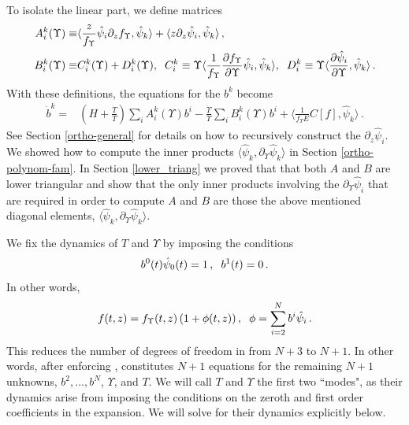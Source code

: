 To isolate the linear part, we define matrices
\begin{align}\label{A_B_matrices}
A^k_i(\Upsilon)\equiv&\langle\frac{z}{f_\Upsilon }\hat\psi_i\partial_zf_\Upsilon ,\hat\psi_k\rangle+\langle z\partial_z \hat\psi_i,\hat\psi_k\rangle\,,\\
B^k_i(\Upsilon)\equiv& C_i^k(\Upsilon)+D_i^k(\Upsilon),\hspace{2mm} C_i^k\equiv\Upsilon\langle\frac{1}{f_\Upsilon }\frac{\partial f_\Upsilon }{\partial\Upsilon}\hat\psi_i,\hat\psi_k\rangle,\hspace{2mm} D_i^k\equiv\Upsilon\langle\frac{\partial\hat{\psi}_i}{\partial \Upsilon},\hat\psi_k\rangle\,. \notag
\end{align}
 With these definitions, the equations for the $b^k$ become
\begin{align}\label{b_eq}
\dot b^k=& \left(H+\frac{\dot{T}}{T}\right)\sum_i A_i^k(\Upsilon)b^i-\frac{\dot{\Upsilon}}{\Upsilon}\sum_i B_i^k(\Upsilon)b^i+\langle\frac{1}{f_\Upsilon E}C[f],\hat\psi_k\rangle\,.
\end{align}
 See Section \ref{ortho-general} for details on how to recursively construct the $\partial_z\hat\psi_i$. We showed how to compute the inner products $\langle\hat\psi_k,\partial_{\Upsilon}\hat\psi_k\rangle$ in  Section \ref{ortho-polynom-fam}. In Section \ref{lower_triang} we proved that that both $A$ and $B$ are lower triangular and show that the only inner products involving the $\partial_\Upsilon\hat{\psi}_i$ that are required in order to compute $A$ and $B$ are those the above mentioned diagonal elements, $\langle\hat\psi_k,\partial_{\Upsilon}\hat\psi_k\rangle$.


We fix the dynamics of $T$ and $\Upsilon$ by imposing the conditions
\begin{equation}\label{b_ics}
b^0(t)\hat\psi_0(t)=1\,,\hspace{2mm}b^1(t)=0\,.
\end{equation}
In other words,
\begin{equation}
f(t,z)=f_\Upsilon (t,z)\left(1+\phi(t,z)\right),\hspace{2mm} \phi=\sum_{i=2}^N b^i\hat\psi_i\,.
\end{equation}
This reduces the number of degrees of freedom in  from $N+3$ to $N+1$.  In other words, after enforcing ,  constitutes $N+1$ equations for the remaining $N+1$ unknowns, $b^2,...,b^N$, $\Upsilon$, and $T$.  We will call $T$ and $\Upsilon$ the first two ``modes", as their dynamics arise from imposing the conditions  on the zeroth and first order coefficients in the expansion. We will solve for their dynamics explicitly below.

